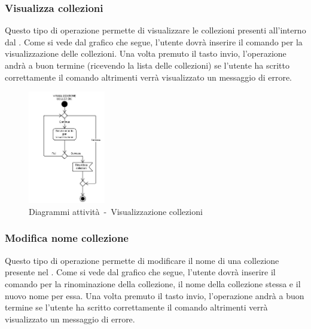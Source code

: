 \documentclass{scalatekids-article}
\begin{document}
\subsubsection{Visualizza collezioni}

Questo tipo di operazione permette di visualizzare le collezioni presenti
all'interno dal . Come si vede dal grafico che segue, l'utente dovrà
inserire il comando per la visualizzazione delle collezioni. Una volta premuto
il tasto invio, l'operazione andrà a buon termine (ricevendo la lista delle
collezioni) se l'utente ha scritto correttamente il comando altrimenti verrà
visualizzato un messaggio di errore.

\begin{figure}[H]
  \begin{center}
    \includegraphics[width=0.3\textwidth, keepaspectratio]{img/diagrammiAttivita/visCollezione.jpeg}
    \caption{Diagrammi attività\ -\ Visualizzazione collezioni}
  \end{center}
\end{figure}

\subsubsection{Modifica nome collezione}

Questo tipo di operazione permette di modificare il nome di una collezione
presente nel . Come si vede dal grafico che segue, l'utente dovrà
inserire il comando per la rinominazione della collezione, il nome della
collezione stessa e il nuovo nome per essa. Una volta premuto il tasto invio,
l'operazione andrà a buon termine se l'utente ha scritto correttamente il
comando altrimenti verrà visualizzato un messaggio di errore.
\end{document}
